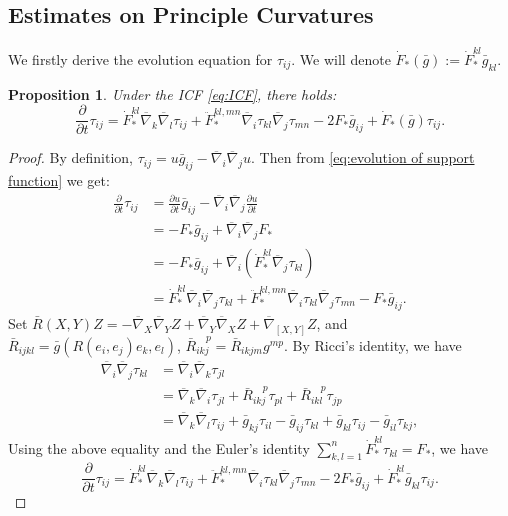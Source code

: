 \documentclass[reqno]{amsart}
\newtheorem{proposition}[theorem]{Proposition}
\theoremstyle{remark}
\newcommand{\pd}[2]{\frac{\partial {#1}}{\partial {#2}}}
\newcommand{\bnabla}{\overline{\nabla}}
\newcommand{\bg}{\bar{g}}
\theoremstyle{definition}
\numberwithin{equation}{section}
\begin{document}
\subsection{Estimates on Principle Curvatures}
We firstly derive the evolution equation for \(\tau_{ij}\). We will denote \(\dot{F}_* (\bg) := \dot{F}_*^{kl}\bg_{kl}\). 
\begin{proposition}
    Under the ICF \eqref{eq:ICF}, there holds:
    \begin{equation}\label{eq:evolution of radii}
        \pd{}{t}\tau_{ij} = \dot{F}_*^{kl}\bnabla_k \bnabla_l \tau_{ij} + \ddot{F}_*^{kl,mn}\bnabla_i \tau_{kl}\bnabla_j \tau_{mn} - 2F_* \bg_{ij} + \dot{F}_*(\bg)\tau_{ij}.
    \end{equation}
\end{proposition}
\begin{proof}
    By definition, \(\tau_{ij} = u\bg_{ij} - \bnabla_i \bnabla_j u\). Then from \eqref{eq:evolution of support function} we get: 
    \[ \begin{aligned}
        \pd{}{t}\tau_{ij} &= \pd{u}{t}\bg_{ij} - \bnabla_i \bnabla_j \pd{u}{t} \\
        &= -F_* \bg_{ij} + \bnabla_i \bnabla_j F_* \\
        &= -F_* \bg_{ij} + \bnabla_i \left(\dot{F}_*^{kl}\bnabla_j \tau_{kl} \right) \\
        &= \dot{F}_*^{kl}\bnabla_i \bnabla_j \tau_{kl} + \ddot{F}_*^{kl,mn}\bnabla_i \tau_{kl} \bnabla_j \tau_{mn} - F_* \bg_{ij}.
    \end{aligned}
    \]
     Set \(\bar{R}(X,Y)Z = -\bnabla_X\bnabla_Y Z + \bnabla_Y\bnabla_X Z + \bnabla_{[X,Y]}Z\), and \(\bar{R}_{ijkl} = \bg(R(e_i,e_j)e_k,e_l)\), \( \bar{R}_{ikj}^{\quad p} = \bar{R}_{ikjm}g^{mp} \). By Ricci's identity, we have
    \[ \begin{aligned}
        \bnabla_i \bnabla_j \tau_{kl} &= \bnabla_i \bnabla_k \tau_{jl} \\
        &= \bnabla_k \bnabla_i \tau_{jl} + \bar{R}_{ikj}^{\quad p}\tau_{pl} + \bar{R}_{ikl}^{\quad p}\tau_{jp}\\
        &= \bnabla_k \bnabla_l \tau_{ij} + \bg_{kj}\tau_{il} - \bg_{ij}\tau_{kl} + \bg_{kl}\tau_{ij} - \bg_{il}\tau_{kj},
    \end{aligned} \]
    Using the above equality and the Euler's identity \(\sum_{k,l=1}^{n}\dot{F}_*^{kl}\tau_{kl} = F_*\), we have 
    \[ \pd{}{t}\tau_{ij} = \dot{F}_*^{kl}\bnabla_k \bnabla_l \tau_{ij} + \ddot{F}_*^{kl,mn}\bnabla_i \tau_{kl}\bnabla_j \tau_{mn} - 2F_* \bg_{ij} + \dot{F}_*^{kl}\bg_{kl}\tau_{ij}. \]
\end{proof}
\end{document}
